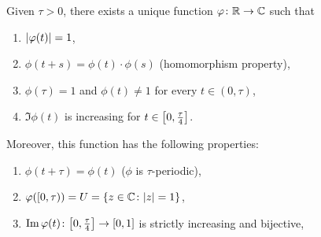 \begin{theorem}
\label{th:omomorfismo_U}
Given $\tau>0$, there exists a unique function $\varphi\colon {\mathbb R} \to {\mathbb C}$ 
such that 
\begin{enumerate}
\item ${\left|\varphi(t)\right|}=1$,
\item $\phi(t+s)=\phi(t)\cdot \phi(s)$ (homomorphism property),
\item $\phi(\tau) = 1$ and $\phi(t)\neq 1$ for every $t\in(0,\tau)$,
\item $\Im\phi(t)$ is increasing for $t\in{\left[ 0,\frac \tau 4 \right]}$.
\end{enumerate}

Moreover, this function has the following properties:
\begin{enumerate}
  \item $\phi(t+\tau)=\phi(t)$ ($\phi$ is $\tau$-periodic),
  \item $\varphi([0,\tau)) = U = {\left\{ z\in {\mathbb C}\colon {\left|z\right|}=1 \right\}}$,
  \item $\operatorname{Im} \varphi(t)\colon {\left[ 0,\frac \tau 4 \right]}\to [0,1]$
  is strictly increasing and bijective,
\end{enumerate}
\end{theorem}
%
